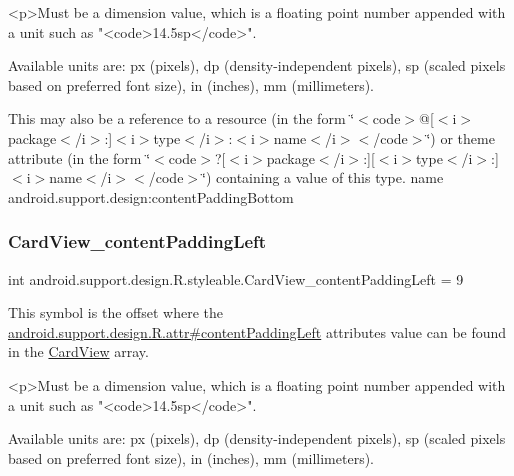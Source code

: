 \begin{DoxyVerb}      <p>Must be a dimension value, which is a floating point number appended with a unit such as "<code>14.5sp</code>".
\end{DoxyVerb}
 Available units are\+: px (pixels), dp (density-\/independent pixels), sp (scaled pixels based on preferred font size), in (inches), mm (millimeters). 

This may also be a reference to a resource (in the form \char`\"{}$<$code$>$@\mbox{[}$<$i$>$package$<$/i$>$\+:\mbox{]}$<$i$>$type$<$/i$>$\+:$<$i$>$name$<$/i$>$$<$/code$>$\char`\"{}) or theme attribute (in the form \char`\"{}$<$code$>$?\mbox{[}$<$i$>$package$<$/i$>$\+:\mbox{]}\mbox{[}$<$i$>$type$<$/i$>$\+:\mbox{]}$<$i$>$name$<$/i$>$$<$/code$>$\char`\"{}) containing a value of this type.  name android.\+support.\+design\+:content\+Padding\+Bottom \mbox{\label{classandroid_1_1support_1_1design_1_1R_1_1styleable_a63ea966e86e38f24ab2c64f89934a768}} 
\subsubsection{\texorpdfstring{Card\+View\+\_\+content\+Padding\+Left}{CardView\_contentPaddingLeft}}
{\footnotesize\ttfamily int android.\+support.\+design.\+R.\+styleable.\+Card\+View\+\_\+content\+Padding\+Left = 9\hspace{0.3cm}{\ttfamily [static]}}

This symbol is the offset where the \hyperlink{classandroid_1_1support_1_1design_1_1R_1_1attr_af303f4ec3e2b84dffd727eb2ec6b14e3}{android.\+support.\+design.\+R.\+attr\#content\+Padding\+Left} attribute\textquotesingle{}s value can be found in the \hyperlink{classandroid_1_1support_1_1design_1_1R_1_1styleable_a56025691fb136d28dc5fce5a25d7c65e}{Card\+View} array.

\begin{DoxyVerb}      <p>Must be a dimension value, which is a floating point number appended with a unit such as "<code>14.5sp</code>".
\end{DoxyVerb}
 Available units are\+: px (pixels), dp (density-\/independent pixels), sp (scaled pixels based on preferred font size), in (inches), mm (millimeters). 


